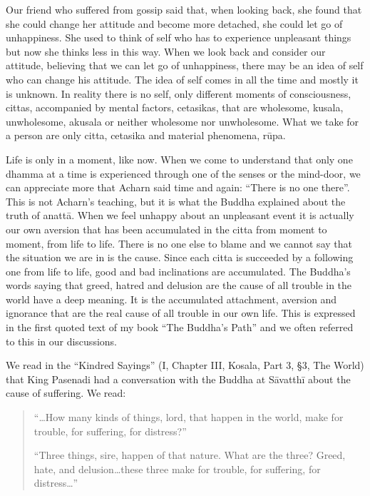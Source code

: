 \documentclass{book}
\begin{document}
Our friend who suffered from gossip said that, when looking
back, she found that she could change her attitude and become more
detached, she could let go of unhappiness. She used to think of self who
has to experience unpleasant things but now she thinks less in this way.
When we look back and consider our attitude, believing that we can let
go of unhappiness, there may be an idea of self who can change his
attitude. The idea of self comes in all the time and mostly it is
unknown. In reality there is no self, only different moments of
consciousness, cittas, accompanied by mental factors, cetasikas, that
are wholesome, kusala, unwholesome, akusala or neither wholesome nor
unwholesome. What we take for a person are only citta, cetasika and
material phenomena, rūpa. 

Life is only in a moment, like now. When we come to
understand that only one dhamma at a time is experienced through one of
the senses or the mind-door, we can appreciate more that Acharn said
time and again: ``There is no one there''. This is not Acharn's
teaching, but it is what the Buddha explained about the truth of anattā.
When we feel unhappy about an unpleasant event it is actually our own
aversion that has been accumulated in the citta from moment to moment,
from life to life. There is no one else to blame and we cannot say that
the situation we are in is the cause. Since each citta is succeeded by a
following one from life to life, good and bad inclinations are
accumulated. The Buddha's words saying that greed, hatred and delusion
are the cause of all trouble in the world have a deep meaning. It is the
accumulated attachment, aversion and ignorance that are the real cause
of all trouble in our own life. This is expressed in the first quoted
text of my book ``The Buddha's Path'' and we often referred to this in
our discussions. 

We read in the ``Kindred Sayings'' (I, Chapter III, Kosala, Part 3, §3, The World) that King Pasenadi had a conversation with the Buddha at Sāvatthī
about the cause of suffering. We read:

\begin{quote}
``\ldots How many kinds
of things, lord, that happen in the world, make for trouble, for
suffering, for distress?''

``Three things, sire,
happen of that nature. What are the three? Greed, hate, and
delusion\ldots these three make for trouble, for suffering, for
distress\ldots ''

\end{quote}
\end{document}
